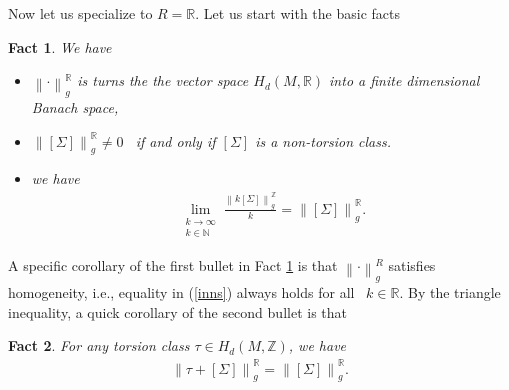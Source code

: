 \documentclass[11pt,a4paper]{amsart}
\numberwithin{equation}{section}
\newcommand{\Si}{\Sigma}
\newcommand{\nog}[1]{\no{#1}^{\R}}
\newcommand{\no}[1]{\left\lVert#1\right\rVert}
\newcommand{\N}{\mathbb{N}}
\newcommand{\R}{\mathbb{R}}
\newcommand{\Z}{\mathbb{Z}}
\theoremstyle{plain}
\newtheorem{fact}{Fact}[subsection]
\theoremstyle{definition}
\numberwithin{equation}{subsection}
\begin{document}
	Now let us specialize to $R=\R$. Let us start with the basic facts \cite[Section 3.9 and Section 5.8]{HFrf}
	\begin{fact}\label{fctnrt}We have
	\begin{itemize}
		\item $\nog{\cdot}_g$ is turns the the vector space $H_d(M,\R)$ into a finite dimensional Banach space, 
		\item		$\nog{[\Si]}_g\not=0$  if and only if $[\Si]$ is a non-torsion class.
		\item we have
		\begin{align}\label{eqfed}
			\lim_{\substack{k\to\infty\\ k\in\N}}\frac{\no{k[\Si]}_g^{\Z}}{k}=\no{[\Si]}_g^{\R}.
		\end{align}
	\end{itemize}
	\end{fact} 
	A specific corollary of the first bullet in Fact \ref{fctnrt} is that $\no{\cdot}_g^R$ satisfies homogeneity, i.e., equality in (\ref{inns}) always holds for all  $k\in\R.$  
	By the triangle inequality, a quick corollary of the second bullet is that 
	\begin{fact}\label{fctfc}
	For any torsion class $\tau\in H_d(M,\Z)$, we have
	\begin{align*}
		\nog{\tau+[\Si]}_g=\nog{[\Si]}_g.
	\end{align*}
	\end{fact}
	
\end{document}
